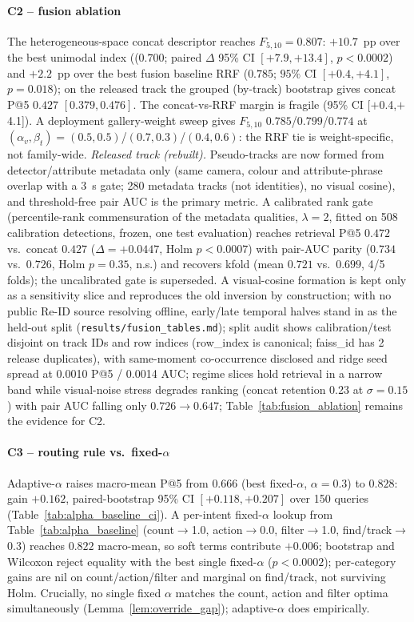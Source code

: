 ﻿\documentclass[conference]{IEEEtran}
\theoremstyle{plain}
\begin{document}
\paragraph*{C2 -- fusion ablation}
The heterogeneous-space concat descriptor reaches $F_{5,10}=0.807$: $+10.7$~pp over the best unimodal index (($0.700$; paired $\Delta$ 95\% CI $[+7.9,+13.4]$, $p<0.0002$) and $+2.2$~pp over the best fusion baseline RRF ($0.785$; $95\%$ CI $[+0.4,+4.1]$, $p=0.018$); on the released track the grouped (by-track) bootstrap gives concat P@5 $0.427$ $[0.379,0.476]$. The concat-vs-RRF margin is fragile (95\% CI [$+$0.4,$+$4.1]). A deployment gallery-weight sweep gives $F_{5,10}$ $0.785$/$0.799$/$0.774$ at $(\alpha_v,\beta_t)=(0.5,0.5)$/$(0.7,0.3)$/$(0.4,0.6)$: the RRF tie is weight-specific, not family-wide. \emph{Released track (rebuilt).} Pseudo-tracks are now formed from detector/attribute metadata only (same camera, colour and attribute-phrase overlap with a 3~s gate; 280 metadata tracks (not identities), no visual cosine), and threshold-free pair AUC is the primary metric. A calibrated rank gate (percentile-rank commensuration of the metadata qualities, $\lambda{=}2$, fitted on 508 calibration detections, frozen, one test evaluation) reaches retrieval P@5 $0.472$ vs.\ concat $0.427$ ($\Delta{=}+0.0447$, Holm $p{<}0.0007$) with pair-AUC parity ($0.734$ vs.\ $0.726$, Holm $p{=}0.35$, n.s.) and recovers kfold (mean $0.721$ vs.\ $0.699$, 4/5 folds); the uncalibrated gate is superseded. A visual-cosine formation is kept only as a sensitivity slice and reproduces the old inversion by construction; with no public Re-ID source resolving offline, early/late temporal halves stand in as the held-out split (\texttt{results/\allowbreak fusion\_\allowbreak tables.md}); split audit shows calibration/test disjoint on track IDs and row indices (row\_index is canonical; faiss\_id has 2 release duplicates), with same-moment co-occurrence disclosed and ridge seed spread at 0.0010 P@5 / 0.0014 AUC; regime slices hold retrieval in a narrow band while visual-noise stress degrades ranking (concat retention 0.23 at $\sigma{=}0.15$) with pair AUC falling only $0.726{\to}0.647$; Table~\ref{tab:fusion_ablation} remains the evidence for C2.

\paragraph*{C3 -- routing rule vs.\ fixed-\texorpdfstring{$\alpha$}{alpha}}
Adaptive-$\alpha$ raises macro-mean P@5 from $0.666$ (best fixed-$\alpha$, $\alpha=0.3$) to $0.828$: gain $+0.162$, paired-bootstrap 95\% CI $[+0.118,+0.207]$ over 150 queries (Table~\ref{tab:alpha_baseline_ci}). A per-intent fixed-$\alpha$ lookup from Table~\ref{tab:alpha_baseline} (count$\to$1.0, action$\to$0.0, filter$\to$1.0, find/track$\to$0.3) reaches $0.822$ macro-mean, so soft terms contribute $+0.006$; bootstrap and Wilcoxon reject equality with the best single fixed-$\alpha$ ($p<0.0002$); per-category gains are nil on count/action/filter and marginal on find/track, not surviving Holm. Crucially, no single fixed $\alpha$ matches the count, action and filter optima simultaneously (Lemma~\ref{lem:override_gap}); adaptive-$\alpha$ does empirically.
\end{document}
